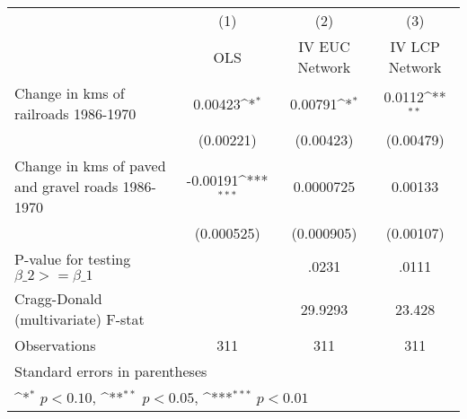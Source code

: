 {
\def\sym#1{\ifmmode^{#1}\else\(^{#1}\)\fi}
\begin{tabular}{l*{3}{c}}
\hline\hline
                &\multicolumn{1}{c}{(1)}&\multicolumn{1}{c}{(2)}&\multicolumn{1}{c}{(3)}\\
                &\multicolumn{1}{c}{OLS}&\multicolumn{1}{c}{IV EUC Network}&\multicolumn{1}{c}{IV LCP Network}\\
\hline
Change in kms of railroads 1986-1970&  0.00423\sym{*}  &  0.00791\sym{*}  &   0.0112\sym{**} \\
                &(0.00221)         &(0.00423)         &(0.00479)         \\
[1em]
Change in kms of paved and gravel roads 1986-1970& -0.00191\sym{***}&0.0000725         &  0.00133         \\
                &(0.000525)         &(0.000905)         &(0.00107)         \\
\hline
P-value for testing $\beta\_{2} >= \beta\_{1}$&                  &    .0231         &    .0111         \\
Cragg-Donald (multivariate) F-stat&                  &  29.9293         &   23.428         \\
Observations    &      311         &      311         &      311         \\
\hline\hline
\multicolumn{4}{l}{\footnotesize Standard errors in parentheses}\\
\multicolumn{4}{l}{\footnotesize \sym{*} \(p<0.10\), \sym{**} \(p<0.05\), \sym{***} \(p<0.01\)}\\
\end{tabular}
}
